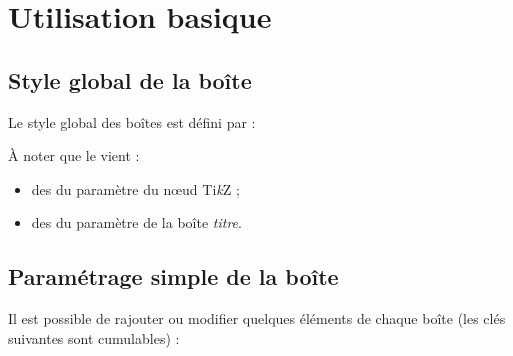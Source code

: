 \documentclass[french,11pt,a4paper]{article}
\begin{document}
\pagebreak

\section{Utilisation basique}

\subsection{Style global de la boîte}

Le style global des boîtes est défini par :

\begin{codehigh}[language=latex/latex2,style/main=cyan!10,style/code=cyan!10]
\end{codehigh}

À noter que le  vient :

\begin{itemize}
	\item des  du paramètre  du nœud Ti\textit{k}Z ;
	\item des  du paramètre  de la boîte \textit{titre}.
\end{itemize}

\subsection{Paramétrage simple de la boîte}

Il est possible de rajouter ou modifier quelques éléments de chaque boîte (les clés suivantes sont cumulables) :
\end{document}
